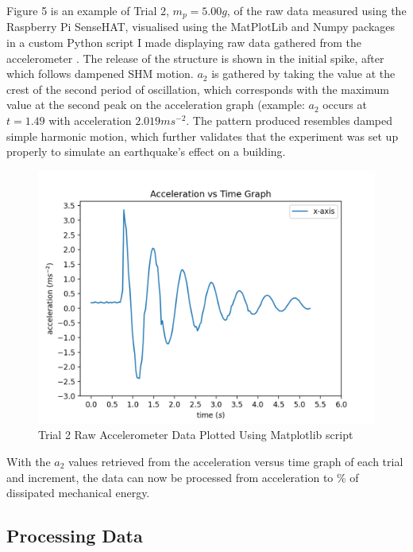 \documentclass[11pt]{article}
\begin{document}
Figure 5 is an example of Trial 2, $m_p=5.00g$, of the raw data measured using the Raspberry Pi SenseHAT, visualised using the MatPlotLib and Numpy packages in a custom Python script I made displaying raw data gathered from the accelerometer \autocite{matplotlib, numpy, python}. The release of the structure is shown in the initial spike, after which follows dampened SHM motion. $a_2$ is gathered by taking the value at the crest of the second period of oscillation, which corresponds with the maximum value at the second peak on the acceleration graph (example: $a_2$ occurs at $t=1.49$ with acceleration $2.019ms^{-2}$. The pattern produced resembles damped simple harmonic motion, which further validates that the experiment was set up properly to simulate an earthquake's effect on a building.

\begin{figure}[h]
\centering
\includegraphics[width=330pt]{img/example_trial.png}
\caption{\label{fig:5}Trial 2 Raw Accelerometer Data Plotted Using Matplotlib script}
\end{figure}

With the $a_2$ values retrieved from the acceleration versus time graph of each trial and increment, the data can now be processed from acceleration to \% of dissipated mechanical energy.

\newpage
\subsection{Processing Data}
\end{document}
